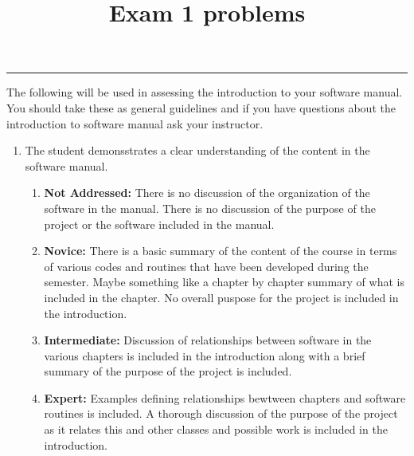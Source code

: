 \documentclass[11pt, oneside]{article}
\title{Exam 1 problems}
\begin{document}
\hrule


The following will be used in assessing the introduction to your software
manual. You should take these as general guidelines and if you have questions
about the introduction to software manual ask your instructor.

\begin{enumerate}
  \item The student demonsstrates a clear understanding of the content in the
        software manual.
    \begin{enumerate}
      \item {\bf Not Addressed:} There is no discussion of the organization of
            the software in the manual. There is no discussion of the purpose of
            the project or the software included in the manual.
      \item {\bf Novice:}  There is a basic summary of the content of the course
            in terms of various codes and routines that have been developed
            during the semester. Maybe something like a chapter by chapter
            summary of what is included in the chapter. No overall puspose for
            the project is included in the introduction.
      \item {\bf Intermediate:} Discussion of relationships between software in
            the various chapters is included in the introduction along with a
            brief summary of the purpose of the project is included.
      \item {\bf Expert:} Examples defining relationships bewtween chapters and
            software routines is included. A thorough discussion of the purpose
            of the project as it relates this and other classes and possible
            work is included in the introduction.
    \end{enumerate}
\end{enumerate}
\end{document}
